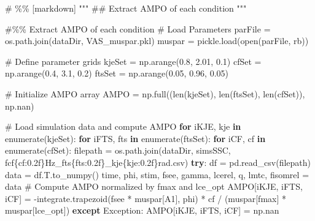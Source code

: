 \documentclass[
  11pt,
  a4paper]{article}
\newenvironment{Shaded}{\begin{snugshade}}{\end{snugshade}}
\newcommand{\BuiltInTok}[1]{\textcolor[rgb]{0.00,0.23,0.31}{#1}}
\newcommand{\CommentTok}[1]{\textcolor[rgb]{0.37,0.37,0.37}{#1}}
\newcommand{\ControlFlowTok}[1]{\textcolor[rgb]{0.00,0.23,0.31}{\textbf{#1}}}
\newcommand{\FloatTok}[1]{\textcolor[rgb]{0.68,0.00,0.00}{#1}}
\newcommand{\KeywordTok}[1]{\textcolor[rgb]{0.00,0.23,0.31}{\textbf{#1}}}
\newcommand{\NormalTok}[1]{\textcolor[rgb]{0.00,0.23,0.31}{#1}}
\newcommand{\OperatorTok}[1]{\textcolor[rgb]{0.37,0.37,0.37}{#1}}
\newcommand{\PreprocessorTok}[1]{\textcolor[rgb]{0.68,0.00,0.00}{#1}}
\newcommand{\SpecialCharTok}[1]{\textcolor[rgb]{0.37,0.37,0.37}{#1}}
\newcommand{\SpecialStringTok}[1]{\textcolor[rgb]{0.13,0.47,0.30}{#1}}
\newcommand{\StringTok}[1]{\textcolor[rgb]{0.13,0.47,0.30}{#1}}
\begin{document}
\begin{Shaded}
\begin{Highlighting}[]
\CommentTok{\# \%\% [markdown]}
\CommentTok{"""}
\CommentTok{\#\# Extract AMPO of each condition}
\CommentTok{"""}

\CommentTok{\#\%\% Extract AMPO of each condition}
\CommentTok{\# Load Parameters}
\NormalTok{parFile }\OperatorTok{=}\NormalTok{ os.path.join(dataDir, }\StringTok{\textquotesingle{}VAS\_muspar.pkl\textquotesingle{}}\NormalTok{)}
\NormalTok{muspar }\OperatorTok{=}\NormalTok{ pickle.load(}\BuiltInTok{open}\NormalTok{(parFile, }\StringTok{\textquotesingle{}rb\textquotesingle{}}\NormalTok{))}

\CommentTok{\# Define parameter grids}
\NormalTok{kjeSet }\OperatorTok{=}\NormalTok{ np.arange(}\FloatTok{0.8}\NormalTok{, }\FloatTok{2.01}\NormalTok{, }\FloatTok{0.1}\NormalTok{)}
\NormalTok{cfSet }\OperatorTok{=}\NormalTok{ np.arange(}\FloatTok{0.4}\NormalTok{, }\FloatTok{3.1}\NormalTok{, }\FloatTok{0.2}\NormalTok{)}
\NormalTok{ftsSet }\OperatorTok{=}\NormalTok{ np.arange(}\FloatTok{0.05}\NormalTok{, }\FloatTok{0.96}\NormalTok{, }\FloatTok{0.05}\NormalTok{)}

\CommentTok{\# Initialize AMPO array}
\NormalTok{AMPO }\OperatorTok{=}\NormalTok{ np.full((}\BuiltInTok{len}\NormalTok{(kjeSet), }\BuiltInTok{len}\NormalTok{(ftsSet), }\BuiltInTok{len}\NormalTok{(cfSet)), np.nan)}

\CommentTok{\# Load simulation data and compute AMPO}
\ControlFlowTok{for}\NormalTok{ iKJE, kje }\KeywordTok{in} \BuiltInTok{enumerate}\NormalTok{(kjeSet):}
    \ControlFlowTok{for}\NormalTok{ iFTS, fts }\KeywordTok{in} \BuiltInTok{enumerate}\NormalTok{(ftsSet):}
        \ControlFlowTok{for}\NormalTok{ iCF, cf }\KeywordTok{in} \BuiltInTok{enumerate}\NormalTok{(cfSet):}
\NormalTok{            filepath }\OperatorTok{=}\NormalTok{ os.path.join(dataDir, }\StringTok{\textquotesingle{}simsSSC\textquotesingle{}}\NormalTok{,}
                                    \SpecialStringTok{f\textquotesingle{}cf}\SpecialCharTok{\{}\NormalTok{cf}\SpecialCharTok{:0.2f\}}\SpecialStringTok{Hz\_fts}\SpecialCharTok{\{}\NormalTok{fts}\SpecialCharTok{:0.2f\}}\SpecialStringTok{\_kje}\SpecialCharTok{\{}\NormalTok{kje}\SpecialCharTok{:0.2f\}}\SpecialStringTok{rad.csv\textquotesingle{}}\NormalTok{)}
            \ControlFlowTok{try}\NormalTok{:}
\NormalTok{                df }\OperatorTok{=}\NormalTok{ pd.read\_csv(filepath)}
\NormalTok{                data }\OperatorTok{=}\NormalTok{ df.T.to\_numpy()}
\NormalTok{                time, phi, stim, fsee, gamma, lcerel, q, lmtc, fisomrel }\OperatorTok{=}\NormalTok{ data}
                \CommentTok{\# Compute AMPO normalized by fmax and lce\_opt}
\NormalTok{                AMPO[iKJE, iFTS, iCF] }\OperatorTok{=} \OperatorTok{{-}}\NormalTok{integrate.trapezoid(fsee }\OperatorTok{*}\NormalTok{ muspar[}\StringTok{\textquotesingle{}A1\textquotesingle{}}\NormalTok{], phi) }\OperatorTok{*}\NormalTok{ cf }\OperatorTok{/}\NormalTok{ (muspar[}\StringTok{\textquotesingle{}fmax\textquotesingle{}}\NormalTok{] }\OperatorTok{*}\NormalTok{ muspar[}\StringTok{\textquotesingle{}lce\_opt\textquotesingle{}}\NormalTok{])}
            \ControlFlowTok{except} \PreprocessorTok{Exception}\NormalTok{:}
\NormalTok{                AMPO[iKJE, iFTS, iCF] }\OperatorTok{=}\NormalTok{ np.nan}


\end{Highlighting}
\end{Shaded}
\end{document}
